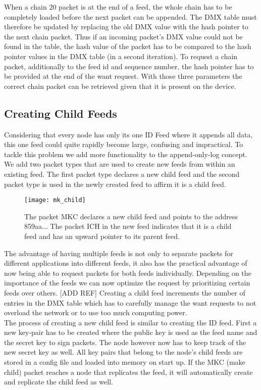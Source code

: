 When a chain 20 packet is at the end of a feed, the whole chain has to be completely loaded before the next packet can be appended. The DMX table must therefore be updated by replacing the old DMX value with the hash pointer to the next chain packet. Thus if an incoming packet's DMX value could not be found in the table, the hash value of the packet has to be compared to the hash pointer values in the DMX table (in a second iteration). To request a chain packet, additionally to the feed id and sequence number, the hash pointer has to be provided at the end of the want request. With those three parameters the correct chain packet can be retrieved given that it is present on the device. \\


\subsection{Creating Child Feeds}
Considering that every node has only its one ID Feed where it appends all data, this one feed could quite rapidly become large, confusing and impractical. To tackle this problem we add more functionality to the append-only-log concept. We add two packet types that are used to create new feeds from within an existing feed. The first packet type declares a new child feed and the second packet type is used in the newly created feed to affirm it is a child feed.

\begin{figure}
\centering
\texttt{[image: mk\_child]}
\caption{The packet MKC declares a new child feed and points to the address 859aa... The packet ICH in the new feed indicates that it is a child feed and has an upward pointer to its parent feed.}
\label{fig:mk_child}
\end{figure}

The advantage of having multiple feeds is not only to separate packets for different applications into different feeds, it also has the practical advantage of now being able to request packets for both feeds individually. Depending on the importance of the feeds we can now optimize the request by prioritizing certain feeds over others. [ADD REF] Creating a child feed increments the number of entries in the DMX table which has to carefully manage the want requests to not overload the network or to use too much computing power. \\
The process of creating a new child feed is similar to creating the ID feed. First a new key-pair has to be created where the public key is used as the feed name and the secret key to sign packets. The node however now has to keep track of the new secret key as well. All key pairs that belong to the node's child feeds are stored in a config file and loaded into memory on start up. If the MKC (make child) packet reaches a node that replicates the feed, it will automatically create and replicate the child feed as well.

